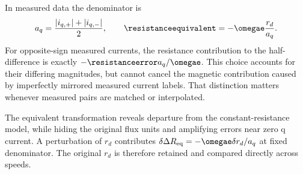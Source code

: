 In measured data the denominator is
\begin{equation}
 a_q=\frac{|i_{q,+}|+|i_{q,-}|}{2},\qquad
 \resistanceequivalent=-\omegae\frac{r_d}{a_q}.
 \label{eq:measured-denominator}
\end{equation}
For opposite-sign measured currents, the resistance contribution to the
half-difference is exactly $-\resistanceerror a_q/\omegae$.
This choice accounts for their differing magnitudes, but cannot cancel the
magnetic contribution caused by imperfectly mirrored measured current labels.
That distinction matters whenever measured pairs are matched or interpolated.

The equivalent transformation reveals departure from the constant-resistance
model, while hiding the original flux units and amplifying errors near zero q
current. A perturbation of $r_d$ contributes
$\delta\Delta R_{\mathrm{eq}}=-\omegae\delta r_d/a_q$ at fixed denominator.
The original $r_d$ is therefore retained and compared directly across speeds.

